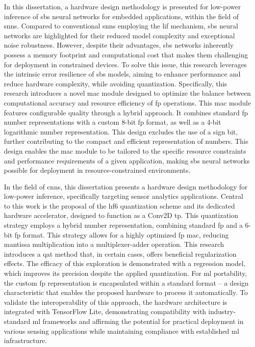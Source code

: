 \documentclass{article}
\begin{document}
In this dissertation, a hardware design methodology is presented for low-power inference of \gls{sbs} neural networks for embedded applications, within the field of \glspl{snn}. Compared to conventional \glspl{snn} employing the \gls{lif} mechanism, \gls{sbs} neural networks are highlighted for their reduced model complexity and exceptional noise robustness. However, despite their advantages, \gls{sbs} networks inherently possess a memory footprint and computational cost that makes them challenging for deployment in constrained devices. To solve this issue, this research leverages the intrinsic error resilience of \gls{sbs} models, aiming to enhance performance and reduce hardware complexity, while avoiding quantization. Specifically, this research introduces a novel \gls{mac} module designed to optimize the balance between computational accuracy and resource efficiency of \gls{fp} operations. This \gls{mac} module features configurable quality through a hybrid approach. It combines standard \gls{fp} number representations with a custom 8-bit \gls{fp} format, as well as a 4-bit logarithmic number representation. This design excludes the use of a sign bit, further contributing to the compact and efficient representation of numbers. This design enables the \gls{mac} module to be tailored to the specific resource constraints and performance requirements of a given application, making \gls{sbs} neural networks possible for deployment in resource-constrained environments.

In the field of \glspl{cnn}, this dissertation presents a hardware design methodology for low-power inference, specifically targeting sensor analytics applications. Central to this work is the proposal of the \gls{hf6} quantization scheme and its dedicated hardware accelerator, designed to function as a Conv2D \gls{tp}. This quantization strategy employs a hybrid number representation, combining standard \gls{fp} and a 6-bit \gls{fp} format. This strategy allows for a highly optimized \gls{fp} \gls{mac}, reducing mantissa multiplication into a multiplexer-adder operation. This research introduces a \gls{qat} method that, in certain cases, offers beneficial regularization effects. The efficacy of this exploration is demonstrated with a regression model, which improves its precision despite the applied quantization. For \gls{ml} portability, the custom \gls{fp} representation is encapsulated within a standard format -- a design characteristic that enables the proposed hardware to process it automatically. To validate the interoperability of this approach, the hardware architecture is integrated with TensorFlow Lite, demonstrating compatibility with industry-standard \gls{ml} frameworks and affirming the potential for practical deployment in various sensing applications while maintaining compliance with established \gls{ml} infrastructure.
\end{document}
